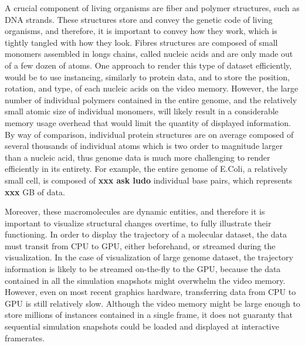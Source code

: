 % 

A crucial component of living organisms are fiber and polymer structures, such as DNA strands.
These structures store and convey the genetic code of living organisms, and therefore, it is important to convey how they work, which is tightly tangled with how they look.
Fibres structures are composed of small monomers assembled in longs chains, called nucleic acids and are only made out of a few dozen of atoms.
One approach to render this type of dataset efficiently, would be to use instancing, similarly to protein data, and to store the position, rotation, and type, of each nucleic acids on the video memory.
However, the large number of individual polymers contained in the entire genome, and the relatively small atomic size of individual monomers, will likely result in a considerable memory usage overhead that would limit the quantity of displayed information.
By way of comparison, individual protein structures are on average composed of several thousands of individual atoms which is two order to magnitude larger than a nucleic acid, thus genome data is much more challenging to render efficiently in its entirety. 
For example, the entire genome of E.Coli, a relatively small cell, is composed of \textbf{xxx ask ludo} individual base pairs, which represents \textbf{xxx} GB of data.

Moreover, these macromolecules are dynamic entities, and therefore it is important to visualize structural changes overtime, to fully illustrate their functioning.
In order to display the trajectory of a molecular dataset, the data must transit from CPU to GPU, either beforehand, or streamed during the visualization.
In the case of visualization of large genome dataset, the trajectory information is likely to be streamed on-the-fly to the GPU, because the data contained in all the simulation snapshots might overwhelm the video memory.
However, even on most recent graphics hardware, transferring data from CPU to GPU is still relatively slow.
Although the video memory might be large enough to store millions of instances contained in a single frame, it does not guaranty that sequential simulation snapshots could be loaded and displayed at interactive framerates.

